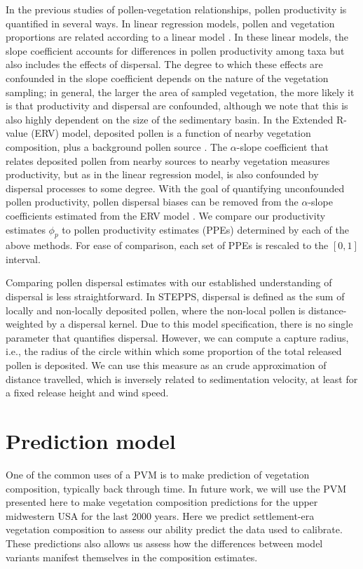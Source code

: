 \documentclass[12pt]{article}
\begin{document}
In the previous studies of pollen-vegetation relationships, pollen
productivity is quantified in several ways. In linear regression
models, pollen and vegetation proportions are related according to a
linear model \citep{XXX}. In these linear models, the slope
coefficient accounts for differences in pollen productivity among taxa
but also includes the effects of dispersal. The degree to which these
effects are confounded in the slope coefficient depends on the nature
of the vegetation sampling; in general, the larger the area of sampled
vegetation, the more likely it is that productivity and dispersal are
confounded, although we note that this is also highly dependent on the
size of the sedimentary basin. In the Extended R-value (ERV) model,
deposited pollen is a function of nearby vegetation composition, plus
a background pollen source \citep{XXX}. The $\alpha$-slope coefficient
that relates deposited pollen from nearby sources to nearby vegetation
measures productivity, but as in the linear regression model, is also
confounded by dispersal processes to some degree. With the goal of
quantifying unconfounded pollen productivity, pollen dispersal biases
can be removed from the $\alpha$-slope coefficients estimated from the
ERV model \citep{XXX}. We compare our productivity estimates $\phi_p$
to pollen productivity estimates (PPEs) determined by each of the
above methods. For ease of comparison, each set of PPEs is rescaled to
the $[0,1]$ interval.

Comparing pollen dispersal estimates with our established
understanding of dispersal is less straightforward. In STEPPS,
dispersal is defined as the sum of locally and non-locally deposited
pollen, where the non-local pollen is distance-weighted by a dispersal
kernel. Due to this model specification, there is no single parameter
that quantifies dispersal. However, we can compute a capture radius,
i.e., the radius of the circle within which some proportion of the
total released pollen is deposited. We can use this measure as an
crude approximation of distance travelled, which is inversely related
to sedimentation velocity, at least for a fixed release height and
wind speed.

\section{Prediction model}
\label{sec:pred}

One of the common uses of a PVM is to make prediction of vegetation
composition, typically back through time. In future work, we will use
the PVM presented here to make vegetation composition predictions for
the upper midwestern USA for the last 2000 years. Here we predict
settlement-era vegetation composition to assess our ability predict
the data used to calibrate. These predictions also allows us assess
how the differences between model variants manifest themselves in the
composition estimates.
\end{document}
